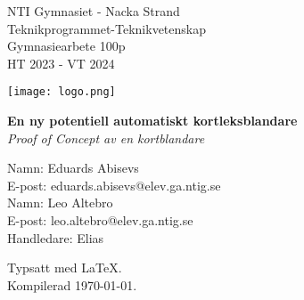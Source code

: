 \begin{titlepage}
	\begin{minipage}[t]{0.45\textwidth}
		\raggedright
		NTI Gymnasiet - Nacka Strand \\
		Teknikprogrammet-Teknikvetenskap \\
		Gymnasiearbete 100p \\
		HT 2023 - VT 2024
	\end{minipage}
	\begin{minipage}[t]{0.5\textwidth}
		\raggedleft
		\begin{adjustbox}{valign=t}
			\texttt{[image: logo.png]}
		\end{adjustbox}
	\end{minipage}

	\vspace*{\fill} %

	\begin{center}
		\Large\textbf{En ny potentiell automatiskt kortleksblandare}\\
		\large\textit{Proof of Concept av en kortblandare}
	\end{center}

	\vspace*{\fill} %

	\begin{minipage}[b]{0.45\textwidth}
		\raggedright
		Namn: Eduards Abisevs\\
		E-post: eduards.abisevs@elev.ga.ntig.se\\
		Namn: Leo Altebro\\
		E-post: leo.altebro@elev.ga.ntig.se\\
		Handledare: Elias
	\end{minipage}
	\begin{minipage}[b]{0.5\textwidth}
		\raggedleft
		Typsatt med \LaTeX. \\
		Kompilerad \today.
	\end{minipage}
\end{titlepage}